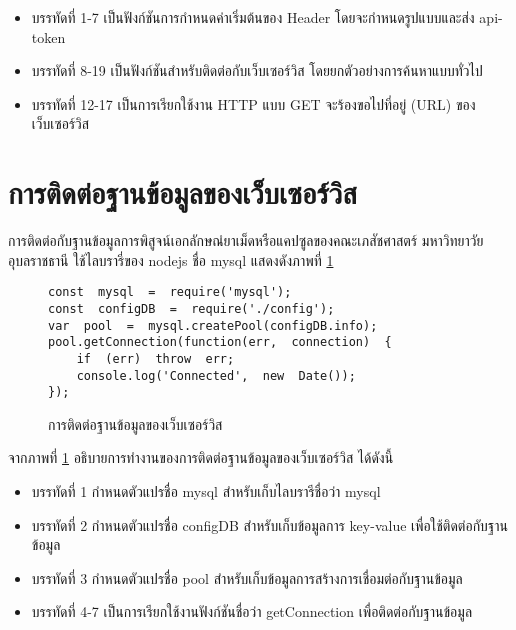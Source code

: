 	\begin{itemize}[label={--}]
		\item บรรทัดที่ 1-7	เป็นฟังก์ชันการกำหนดค่าเริ่มต้นของ Header โดยจะกำหนดรูปแบบและส่ง api-token 
		\item บรรทัดที่ 8-19	เป็นฟังก์ชันสำหรับติดต่อกับเว็บเซอร์วิส โดยยกตัวอย่างการค้นหาแบบทั่วไป
		\item บรรทัดที่ 12-17	เป็นการเรียกใช้งาน HTTP แบบ GET จะร้องขอไปที่อยู่ (URL) ของเว็บเซอร์วิส
		
	\end{itemize}

\section{การติดต่อฐานข้อมูลของเว็บเซอร์วิส}
	การติดต่อกับฐานข้อมูลการพิสูจน์เอกลักษณํยาเม็ดหรือแคปซูลของคณะเภสัชศาสตร์ มหาวิทยาวัยอุบลราชธานี 
	ใช้ไลบรารี่ของ nodejs ชื่อ mysql 
	แสดงดังภาพที่ \ref{Fig:connectDB}

	\begin{figure}[H]
		{\begin{lstlisting}
const  mysql  =  require('mysql');    
const  configDB  =  require('./config');    
var  pool  =  mysql.createPool(configDB.info);    
pool.getConnection(function(err,  connection)  {        
	if  (err)  throw  err;        
	console.log('Connected',  new  Date());    
});    
		\end{lstlisting}}
		\caption{การติดต่อฐานข้อมูลของเว็บเซอร์วิส}
		\label{Fig:connectDB}
	\end{figure}
	จากภาพที่ \ref{Fig:connectDB} อธิบายการทำงานของการติดต่อฐานข้อมูลของเว็บเซอร์วิส ได้ดังนี้
	\begin{itemize}[label={--}]
		\item บรรทัดที่ 1	กำหนดตัวแปรชื่อ mysql สำหรับเก็บไลบรารีชื่อว่า mysql
		\item บรรทัดที่ 2	กำหนดตัวแปรชื่อ configDB สำหรับเก็บข้อมูลการ key-value เพื่อใช้ติดต่อกับฐานข้อมูล
		\item บรรทัดที่ 3	กำหนดตัวแปรชื่อ pool สำหรับเก็บข้อมูลการสร้างการเชื่อมต่อกับฐานข้อมูล
		\item บรรทัดที่ 4-7	เป็นการเรียกใช้งานฟังก์ชันชื่อว่า getConnection เพื่อติดต่อกับฐานข้อมูล 
	\end{itemize}


